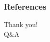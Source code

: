 \documentclass[10pt]{beamer}
\begin{document}
% 


\section*{}%
  \begin{frame}
    \frametitle{References}
    
    
  \end{frame}

  \begin{frame}[plain]
    \centering
    \Huge Thank you!\\
    \Huge Q\&A \par
  \end{frame}
\end{document}
